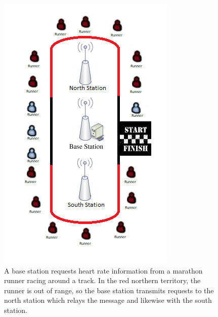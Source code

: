 \begin{figure}[h]
	\centering
	\includegraphics[width=1\linewidth]{introduction/scenario/fig/scenarioIntroduction.png}
	\caption{A base station requests heart rate information from a marathon runner racing around a track. In the red northern territory, the runner is out of range, so the base station transmits requests to the north station which relays the message and likewise with the south station.}
	\label{fig:scenarioIntroduction}
\end{figure}
